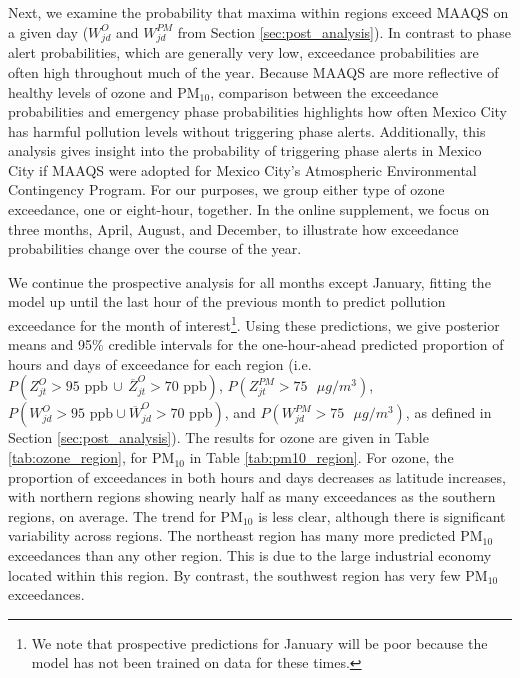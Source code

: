 \documentclass[alpha-refs]{wiley-article}
\begin{document}
Next, we examine the probability that maxima within regions exceed MAAQS on a given day ($W_{jd}^O$ and $W_{jd}^{PM}$ from Section \ref{sec:post_analysis}). In contrast to phase alert probabilities, which are generally very low, exceedance probabilities are often high throughout much of the year. Because MAAQS are more reflective of healthy levels of ozone and $\text{PM}_{10}$, comparison between the exceedance probabilities and emergency phase probabilities highlights how often Mexico City has harmful pollution levels without triggering phase alerts. Additionally, this analysis gives insight into the probability of triggering phase alerts in Mexico City if MAAQS were adopted for Mexico City's Atmospheric Environmental Contingency Program. For our purposes, we group either type of ozone exceedance, one or eight-hour, together. In the online supplement, we focus on three months, April, August, and December, to illustrate how exceedance probabilities change over the course of the year.

We continue the prospective analysis for all months except January, fitting the model up until the last hour of the previous month to predict pollution exceedance for the month of interest\footnote{We note that prospective predictions for January will be poor because the model has not been trained on data for these times.}.
Using these predictions, we give posterior means and 95\% credible intervals for the one-hour-ahead predicted proportion of hours and days of exceedance for each region (i.e. $P(Z_{jt}^O > 95 \text{ ppb} \,\cup \, \overline{Z}_{jt}^{O} > 70 \text{ ppb} )$, $P(Z_{jt}^{PM} >  75 \text{ } \mu g/m^3)$, $ P(W_{jd}^{O}  > 95 \text{ ppb}  \cup \overline{W}_{jd}^{O} > 70 \text{ ppb} )$, and $P(W_{jd}^{PM} >  75 \text{ } \mu g/m^3)$, as defined in Section \ref{sec:post_analysis}). The results for ozone are given in Table \ref{tab:ozone_region}, for $\text{PM}_{10}$ in Table \ref{tab:pm10_region}. For ozone, the proportion of exceedances in both hours and days decreases as latitude increases, with northern regions showing nearly half as many exceedances as the southern regions, on average. The trend for $\text{PM}_{10}$ is less clear, although there is significant variability across regions. The northeast region has many more predicted $\text{PM}_{10}$ exceedances than any other region. This is due to the large industrial economy located within this region. By contrast, the southwest region has very few $\text{PM}_{10}$ exceedances.
\end{document}

